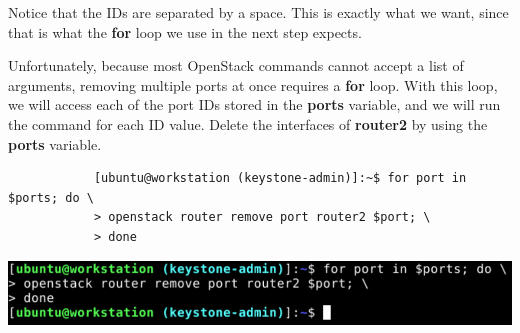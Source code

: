 \documentclass[letterpaper, 12pt]{article}
\begin{document}
\begin{enumerate}
    \begin{notebox}
        Notice that the IDs are separated by a space.
        This is exactly what we want, since that is what the \textbf{for} loop we use in the next step expects.
    \end{notebox}

    \begin{labstep}
        Unfortunately, because most OpenStack commands cannot accept a list of arguments, removing multiple ports at once requires a \textbf{for} loop.
        With this loop, we will access each of the port IDs stored in the \textbf{ports} variable, and we will run the command for each ID value.
        Delete the interfaces of \textbf{router2} by using the \textbf{ports} variable.
        \begin{lstlisting}
            [ubuntu@workstation (keystone-admin)]:~$ for port in $ports; do \
            > openstack router remove port router2 $port; \
            > done
        \end{lstlisting}

        \begin{center}
            \includegraphics[width=\linewidth]{images/part4/step7.png}
        \end{center}
    \end{labstep}


\end{enumerate}
\end{document}
